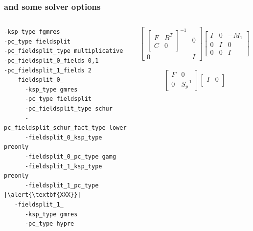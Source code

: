 \documentclass[presentation,aspectratio=43]{beamer}
\begin{document}
\begin{frame}[fragile,t]
  \frametitle{and some solver options}
  \begin{columns}[t]
    \begin{column}{0.49\textwidth}
\begin{verbatim}
-ksp_type fgmres
-pc_type fieldsplit
-pc_fieldsplit_type multiplicative
-pc_fieldsplit_0_fields 0,1
-pc_fieldsplit_1_fields 2
   -fieldsplit_0_
      -ksp_type gmres
      -pc_type fieldsplit
      -pc_fieldsplit_type schur
      -pc_fieldsplit_schur_fact_type lower
      -fieldsplit_0_ksp_type preonly
      -fieldsplit_0_pc_type gamg
      -fieldsplit_1_ksp_type preonly
      -fieldsplit_1_pc_type |\alert{\textbf{XXX}}|
   -fieldsplit_1_
      -ksp_type gmres
      -pc_type hypre
\end{verbatim}
    \end{column}
    \hspace{0.02\textwidth}
    \begin{column}{0.49\textwidth}
      {\tiny
      \begin{equation*}
        \begin{bmatrix}
          \begin{bmatrix}
              F & B^T\\
              C & 0
            \end{bmatrix}^{-1} & 0\\
          0 & I
        \end{bmatrix}
        \begin{bmatrix}
          I & 0 & -M_1\\
          0 & I & 0 \\
          0 & 0 & I
        \end{bmatrix}
        \begin{bmatrix}
          I & 0 & 0\\
          0 & I & 0\\
          0 & 0 & K^{-1}
        \end{bmatrix}
      \end{equation*}
      \\[\baselineskip]
      \begin{equation*}
        \begin{bmatrix}
          F & 0 \\
          0 & S_p^{-1}
        \end{bmatrix}
        \begin{bmatrix}
          I & 0\\

\end{bmatrix}
\end{equation*}}
\end{column}
\end{columns}
\end{frame}
\end{document}

